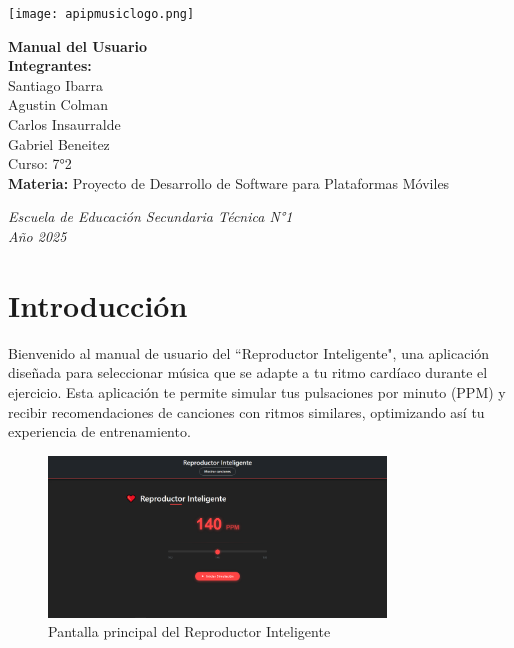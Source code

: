 \documentclass[a4paper,12pt]{article}
\begin{document}
\begin{flushright}
    \texttt{[image: apipmusiclogo.png]} %
\end{flushright}

\vspace*{2cm}

\begin{center}
    {\LARGE\bfseries Manual del Usuario} \\[1.5cm]
    \textbf{Integrantes:} \\[0.3cm]
    Santiago Ibarra \\[0.2cm]
    Agustin Colman \\[0.2cm]
    Carlos Insaurralde \\[0.2cm]
    Gabriel Beneitez \\[1.2cm]
    Curso: 7°2 \\
    \vspace{0.5cm}
    \textbf{Materia:} Proyecto de Desarrollo de Software para Plataformas Móviles
\end{center}

\vfill

\begin{center}
    \textit{Escuela de Educación Secundaria Técnica N°1} \\
    \textit{Año 2025}
\end{center}

\thispagestyle{empty}
\newpage

\tableofcontents
\newpage

\section{Introducción}
Bienvenido al manual de usuario del ``Reproductor Inteligente", una aplicación diseñada para seleccionar música que se adapte a tu ritmo cardíaco durante el ejercicio. Esta aplicación te permite simular tus pulsaciones por minuto (PPM) y recibir recomendaciones de canciones con ritmos similares, optimizando así tu experiencia de entrenamiento.

\begin{figure}[h]
    \centering
    \includegraphics[width=0.8\textwidth]{imagenes/pantalla_principal.png}
    \caption{Pantalla principal del Reproductor Inteligente}
\end{figure}
\end{document}
